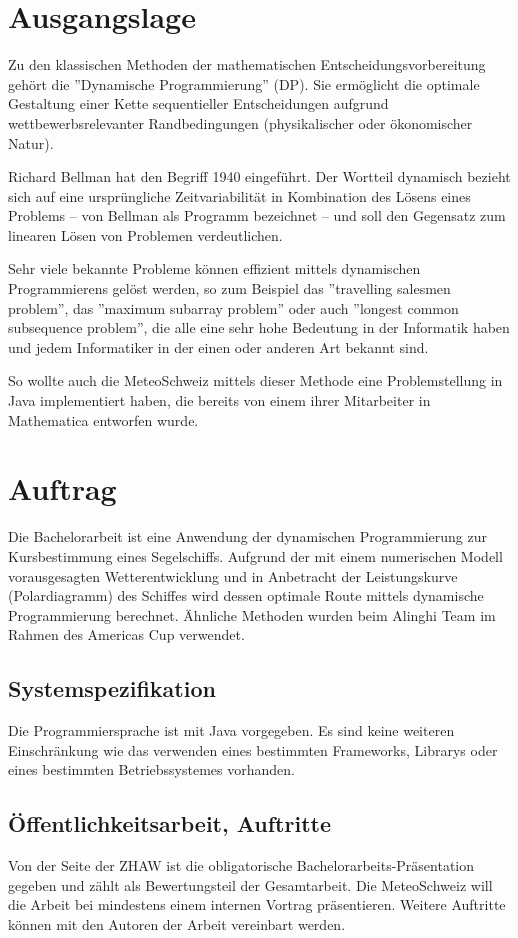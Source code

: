 \documentclass[a4paper,10pt]{article}
\begin{document}
\section{Ausgangslage}
Zu den klassischen Methoden der mathematischen Entscheidungsvorbereitung gehört
die ''Dynamische Programmierung'' (DP). Sie ermöglicht die optimale Gestaltung
einer Kette sequentieller Entscheidungen aufgrund wettbewerbsrelevanter
Randbedingungen (physikalischer oder ökonomischer Natur).

Richard Bellman hat den Begriff 1940 eingeführt. Der Wortteil dynamisch
bezieht sich auf eine ursprüngliche Zeitvariabilität in Kombination des Lösens
eines Problems -- von Bellman als Programm bezeichnet -- und soll den
Gegensatz zum linearen Lösen von Problemen verdeutlichen.

Sehr viele bekannte Probleme können effizient mittels dynamischen
Programmierens gelöst werden, so zum Beispiel das ''travelling salesmen
problem'', das ''maximum subarray problem'' oder auch ''longest common
subsequence problem'', die alle eine sehr hohe Bedeutung in der Informatik
haben und jedem Informatiker in der einen oder anderen Art bekannt sind.

So wollte auch die MeteoSchweiz mittels dieser Methode eine Problemstellung
in Java implementiert haben, die bereits von einem ihrer Mitarbeiter in
Mathematica entworfen wurde.

\section{Auftrag}
Die Bachelorarbeit ist eine Anwendung der dynamischen Programmierung zur
Kursbestimmung eines Segelschiffs. Aufgrund der mit einem numerischen
Modell vorausgesagten Wetterentwicklung und in Anbetracht der Leistungskurve
(Polardiagramm) des Schiffes wird dessen optimale Route mittels dynamische
Programmierung berechnet. Ähnliche Methoden wurden beim Alinghi Team im Rahmen
des Americas Cup verwendet.

\subsection{Systemspezifikation}
Die Programmiersprache ist mit Java vorgegeben. Es sind keine weiteren
Einschränkung wie das verwenden eines bestimmten Frameworks, Librarys oder
eines bestimmten Betriebssystemes vorhanden.

\subsection{Öffentlichkeitsarbeit, Auftritte}
Von der Seite der ZHAW ist die obligatorische Bachelorarbeits-Präsentation
gegeben und zählt als Bewertungsteil der Gesamtarbeit. Die MeteoSchweiz will
die Arbeit bei mindestens einem internen Vortrag präsentieren. Weitere
Auftritte können mit den Autoren der Arbeit vereinbart werden.
\end{document}
